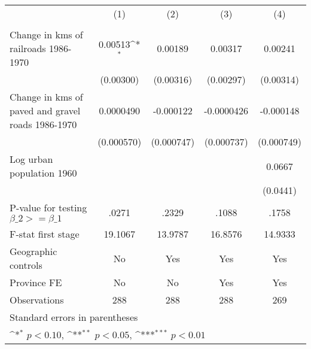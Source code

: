 {
\def\sym#1{\ifmmode^{#1}\else\(^{#1}\)\fi}
\begin{tabular}{l*{4}{c}}
\hline\hline
                &\multicolumn{1}{c}{(1)}&\multicolumn{1}{c}{(2)}&\multicolumn{1}{c}{(3)}&\multicolumn{1}{c}{(4)}\\
                &\multicolumn{1}{c}{}&\multicolumn{1}{c}{}&\multicolumn{1}{c}{}&\multicolumn{1}{c}{}\\
\hline
Change in kms of railroads 1986-1970&  0.00513\sym{*}  &  0.00189         &  0.00317         &  0.00241         \\
                &(0.00300)         &(0.00316)         &(0.00297)         &(0.00314)         \\
[1em]
Change in kms of paved and gravel roads 1986-1970&0.0000490         &-0.000122         &-0.0000426         &-0.000148         \\
                &(0.000570)         &(0.000747)         &(0.000737)         &(0.000749)         \\
[1em]
Log urban population 1960&                  &                  &                  &   0.0667         \\
                &                  &                  &                  & (0.0441)         \\
\hline
P-value for testing $\beta\_{2} >= \beta\_{1}$&    .0271         &    .2329         &    .1088         &    .1758         \\
F-stat first stage&  19.1067         &  13.9787         &  16.8576         &  14.9333         \\
Geographic controls&       No         &      Yes         &      Yes         &      Yes         \\
Province FE     &       No         &       No         &      Yes         &      Yes         \\
Observations    &      288         &      288         &      288         &      269         \\
\hline\hline
\multicolumn{5}{l}{\footnotesize Standard errors in parentheses}\\
\multicolumn{5}{l}{\footnotesize \sym{*} \(p<0.10\), \sym{**} \(p<0.05\), \sym{***} \(p<0.01\)}\\
\end{tabular}
}

